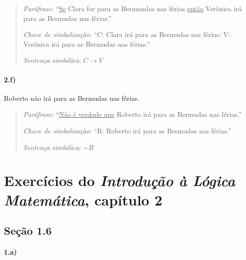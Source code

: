\documentclass[pdftex,a4paper,12pt,brazil]{article} %
\begin{document}
\begin{quote}
  \emph{Paráfrase}: ``\underline{Se} Clara for para as Bermundas nas férias \underline{então} Verônica irá para as Bermudas nas férias.''

  \emph{Chave de simbolização}: ``C: Clara irá para as Bermudas nas férias; V: Verônica irá para as Bermudas nas férias.''

  \emph{Sentença simbólica}: $C \rightarrow V$
\end{quote}

\paragraph{2.f)} Roberto não irá para as Bermudas nas férias.

\begin{quote}
  \emph{Paráfrase}: ``\underline{Não é verdade que} Roberto irá para as Bermudas nas férias.''

  \emph{Chave de simbolização}: ``R: Roberto irá para as Bermudas nas férias.''

  \emph{Sentença simbólica}: $\sim R$
\end{quote}




\section{Exercícios do \emph{Introdução à Lógica Matemática}, capítulo 2}
\label{ilm-2}


\subsection{Seção 1.6}
\label{ilm-1-16}

\paragraph{1.a)} 
\end{document}
